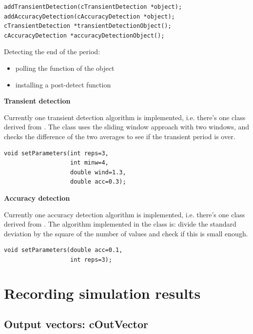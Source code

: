 \begin{verbatim}
addTransientDetection(cTransientDetection *object);
addAccuracyDetection(cAccuracyDetection *object);
cTransientDetection *transientDetectionObject();
cAccuracyDetection *accuracyDetectionObject();
\end{verbatim}


Detecting the end of the period:
\begin{itemize}
\item{polling the  function of the object}
\item{installing a post-detect function}
\end{itemize}


\textbf{Transient detection}


Currently one transient detection algorithm
is implemented, i.e.  there's one class derived from
. The  class
uses the sliding window approach with two windows, and checks the
difference of the two averages to see if the transient period is over.

\begin{verbatim}
void setParameters(int reps=3,
                   int minw=4,
                   double wind=1.3,
                   double acc=0.3);
\end{verbatim}

\textbf{Accuracy detection}


Currently one accuracy detection algorithm
is implemented, i.e.  there's one class derived from
. The algorithm implemented in the
 class is: divide the standard deviation by the
square of the number of values and check if this is small enough.

\begin{verbatim}
void setParameters(double acc=0.1,
                   int reps=3);
\end{verbatim}




\section{Recording simulation results}

\subsection{Output vectors: cOutVector}


